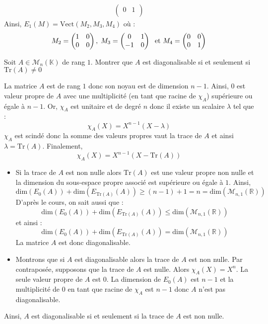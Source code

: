 \documentclass[a4paper,10pt]{report}
\begin{document}
\begin{enumerate}
\begin{itemize}
\begin{align*}
\begin{pmatrix}
0 & 1 \\ 
\end{pmatrix} 
\end{align*}
Ainsi, $E_1(M) = \textrm{Vect}(M_2,M_3,M_4)$ où :
$$ M_2 = \begin{pmatrix} 1 & 0 \\
0 & 0 \\ 
\end{pmatrix} , \; M_3= \begin{pmatrix}
0 & 1 \\
-1 & 0
\end{pmatrix} \; \hbox{ et } M_4 = \begin{pmatrix} 0 & 0 \\
0 & 1 \\ 
\end{pmatrix}  $$
\end{itemize}
\end{enumerate}

\begin{Exa} Soit $A \in \mathcal{M}_{n}(\mathbb{K})$ de rang $1$. Montrer que $A$ est diagonalisable si et seulement si $\textrm{Tr}(A) \neq 0$ \end{Exa}

\corr La matrice $A$ est de rang $1$ donc son noyau est de dimension $n-1$. Ainsi, $0$ est valeur propre de $A$ avec une multiplicité (en tant que racine de $\chi_A$) supérieure ou égale à $n-1$. Or, $\chi_A$ est unitaire et de degré $n$ donc il existe un scalaire $\lambda$ tel que :
$$ \chi_A(X)=X^{n-1}(X- \lambda)$$
$\chi_A$ est scindé donc la somme des valeurs propres vaut la trace de $A$ et ainsi $\lambda = \textrm{Tr}(A)$. Finalement,
$$ \chi_A(X)= X^{n-1}(X- \textrm{Tr}(A))$$
\begin{itemize}
\item Si la trace de $A$ est non nulle alors $\textrm{Tr}(A)$ est une valeur propre non nulle et la dimension du sous-espace propre associé est supérieure ou égale à $1$. Ainsi,
$$ \textrm{dim}(E_0(A))+ \textrm{dim}(E_{\textrm{Tr}(A)}(A)) \geq (n-1)+1 = n = \textrm{dim}(\mathcal{M}_{n,1}(\mathbb{R}))$$
D'après le cours, on sait aussi que :
$$ \textrm{dim}(E_0(A))+ \textrm{dim}(E_{\textrm{Tr}(A)}(A)) \leq \textrm{dim}(\mathcal{M}_{n,1}(\mathbb{R}))$$
et ainsi :
$$ \textrm{dim}(E_0(A))+ \textrm{dim}(E_{\textrm{Tr}(A)}(A)) = \textrm{dim}(\mathcal{M}_{n,1}(\mathbb{R}))$$
La matrice $A$ est donc diagonalisable.
\item Montrons que si $A$ est diagonalisable alors la trace de $A$ est non nulle. Par contraposée, supposons que la trace de $A$ est nulle. Alors $\chi_A(X)=X^n$. La seule valeur propre de $A$ est $0$. La dimension de $E_0(A)$ est $n-1$ et la multiplicité de $0$ en tant que racine de $\chi_A$ est $n-1$ donc $A$ n'est pas diagonalisable.
\end{itemize}
Ainsi, $A$ est diagonalisable si et seulement si la trace de $A$ est non nulle.
\end{document}
